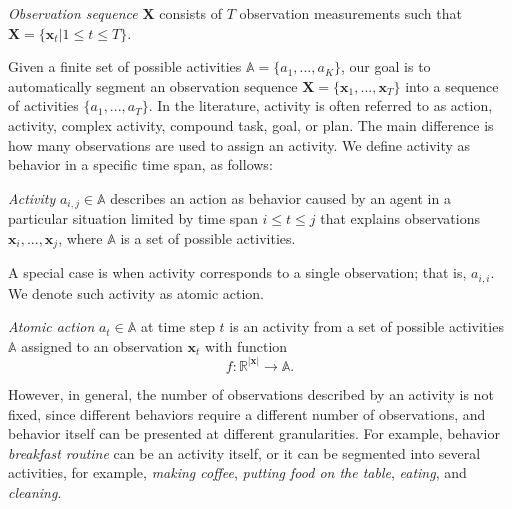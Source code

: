 \begin{definition}
\label{def:observation_vector}
	\emph{Observation sequence} $\mathbf{X}$ consists of $T$ observation measurements such that $\mathbf{X}=\{ \mathbf{x}_t | 1 \leq t \leq T \}$.
\end{definition}


Given a finite set of possible activities $\mathbb{A}=\{a_1, ..., a_K\}$, our  goal is to automatically segment an observation sequence $\mathbf{X}=\{\mathbf{x}_1, ..., \mathbf{x}_T\}$ into a sequence of activities $\{a_1, ..., a_{T}\}$. %
In the literature, activity is often referred to as action, activity, complex activity, compound task, goal, or plan. The main difference is how many observations are used to assign an activity. We define activity as behavior in a specific time span, as follows:
\begin{definition}
\label{def:activity}
	\emph{Activity} $a_{i, j} \in \mathbb{A}$ describes an action as behavior caused by an agent in a particular situation limited by time span $i \leq t \leq j$ that explains observations $\mathbf{x}_i, ..., \mathbf{x}_j$, where $\mathbb{A}$ is a set of possible activities.
\end{definition}

A special case is when activity corresponds to a single observation; that is, $a_{i,i}$. We denote such activity as atomic action.
\begin{definition}
\label{def:action}
	\emph{Atomic action} $a_t \in \mathbb{A}$ at time step $t$ is an activity from a set of possible activities $\mathbb{A}$ assigned to an observation $\mathbf{x}_t$ with function  
	$$
	f: \mathbb{R}^{|\mathbf{x}|} \rightarrow \mathbb{A}.
	$$
\end{definition}

However, in general, the number of observations described by an activity is not fixed, since different behaviors require a different number of observations, and behavior itself can be presented at different granularities. For example, behavior {\it breakfast routine} can be an activity itself, or it can be segmented into several activities, for example, {\it making coffee}, {\it putting food on the table}, {\it eating}, and {\it cleaning}.

